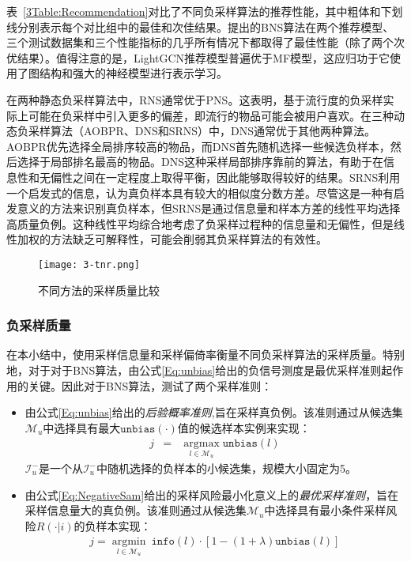 表~\ref{3Table:Recommendation}对比了不同负采样算法的推荐性能，其中粗体和下划线分别表示每个对比组中的最佳和次佳结果。提出的BNS算法在两个推荐模型、三个测试数据集和三个性能指标的几乎所有情况下都取得了最佳性能（除了两个次优结果）。值得注意的是，LightGCN推荐模型普遍优于MF模型，这应归功于它使用了图结构和强大的神经模型进行表示学习。

在两种静态负采样算法中，RNS通常优于PNS。这表明，基于流行度的负采样实际上可能在负采样中引入更多的偏差，即流行的物品可能会被用户喜欢。在三种动态负采样算法（AOBPR、DNS和SRNS）中，DNS通常优于其他两种算法。AOBPR优先选择全局排序较高的物品，而DNS首先随机选择一些候选负样本，然后选择于局部排名最高的物品。DNS这种采样局部排序靠前的算法，有助于在信息性和无偏性之间在一定程度上取得平衡，因此能够取得较好的结果。SRNS利用一个启发式的信息，认为真负样本具有较大的相似度分数方差。尽管这是一种有启发意义的方法来识别真负样本，但SRNS是通过信息量和样本方差的线性平均选择高质量负例。这种线性平均综合地考虑了负采样过程种的信息量和无偏性，但是线性加权的方法缺乏可解释性，可能会削弱其负采样算法的有效性。
\begin{figure*}[!]
	\centering
	\texttt{[image: 3-tnr.png]}
	\caption{不同方法的采样质量比较}
	\label{Fig:NegQua}
\end{figure*}
\subsubsection{负采样质量}

在本小结中，使用采样信息量和采样偏倚率衡量不同负采样算法的采样质量。特别地，对于对于BNS算法，由公式\eqref{Eq:unbias}给出的负信号测度是最优采样准则起作用的关键。因此对于BNS算法，测试了两个采样准则：
\begin{itemize}
\item 由公式\eqref{Eq:unbias}给出的\textit{后验概率准则},旨在采样真负例。该准则通过从候选集$\mathcal{M}_u$中选择具有最大$\mathtt{unbias}(\cdot)$值的候选样本实例来实现：
\begin{eqnarray} \label{Eq:PosteriorSam}
	j   &=&   \mathop{\arg\max}\limits_{l \in \mathcal{M}_u} \mathtt{unbias}(l)
\end{eqnarray}
$\mathcal{I}_u^-$是一个从$\mathcal{I}_u^-$中随机选择的负样本的小候选集，规模大小固定为5。

\item 由公式\eqref{Eq:NegativeSam}给出的采样风险最小化意义上的\textit{最优采样准则}，旨在采样信息量大的真负例。该准则通过从候选集$\mathcal{M}_u$中选择具有最小条件采样风险$R(\cdot|i)$的负样本实现：
\begin{eqnarray} \label{Eq:NegativeSam1}
	j  = \mathop{\arg\min}\limits_{l \in\mathcal{M}_u}~ \mathtt{info}(l)\cdot [1-(1+\lambda)\mathtt{unbias}(l)]
\end{eqnarray}
\end{itemize}

